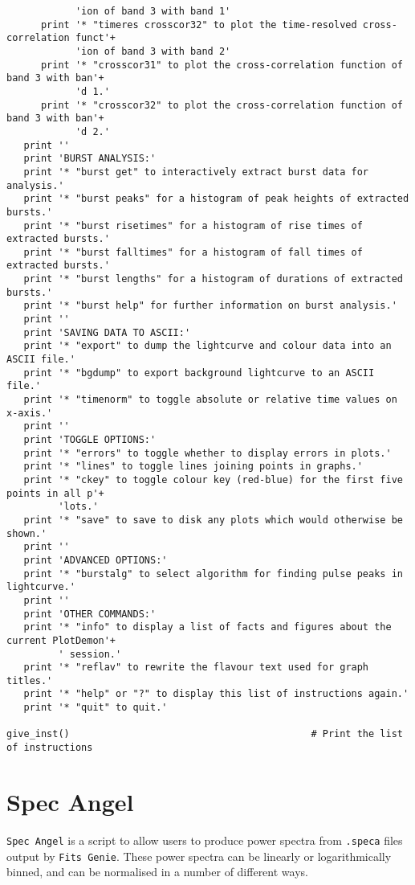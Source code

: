 \begin{verbatim}
            'ion of band 3 with band 1'
      print '* "timeres crosscor32" to plot the time-resolved cross-correlation funct'+
            'ion of band 3 with band 2'
      print '* "crosscor31" to plot the cross-correlation function of band 3 with ban'+
            'd 1.'
      print '* "crosscor32" to plot the cross-correlation function of band 3 with ban'+
            'd 2.'
   print ''
   print 'BURST ANALYSIS:'
   print '* "burst get" to interactively extract burst data for analysis.'
   print '* "burst peaks" for a histogram of peak heights of extracted bursts.'
   print '* "burst risetimes" for a histogram of rise times of extracted bursts.'
   print '* "burst falltimes" for a histogram of fall times of extracted bursts.'
   print '* "burst lengths" for a histogram of durations of extracted bursts.'
   print '* "burst help" for further information on burst analysis.'
   print ''
   print 'SAVING DATA TO ASCII:'
   print '* "export" to dump the lightcurve and colour data into an ASCII file.'
   print '* "bgdump" to export background lightcurve to an ASCII file.'
   print '* "timenorm" to toggle absolute or relative time values on x-axis.'
   print ''
   print 'TOGGLE OPTIONS:'
   print '* "errors" to toggle whether to display errors in plots.'
   print '* "lines" to toggle lines joining points in graphs.'
   print '* "ckey" to toggle colour key (red-blue) for the first five points in all p'+
         'lots.'
   print '* "save" to save to disk any plots which would otherwise be shown.'
   print ''
   print 'ADVANCED OPTIONS:'
   print '* "burstalg" to select algorithm for finding pulse peaks in lightcurve.'
   print ''
   print 'OTHER COMMANDS:'
   print '* "info" to display a list of facts and figures about the current PlotDemon'+
         ' session.'
   print '* "reflav" to rewrite the flavour text used for graph titles.'
   print '* "help" or "?" to display this list of instructions again.'
   print '* "quit" to quit.'

give_inst()                                          # Print the list of instructions
\end{verbatim}

\section{Spec Angel}

\par \texttt{Spec Angel} is a script to allow users to produce power spectra from \texttt{.speca} files output by \texttt{Fits Genie}.  These power spectra can be linearly or logarithmically binned, and can be normalised in a number of different ways.

